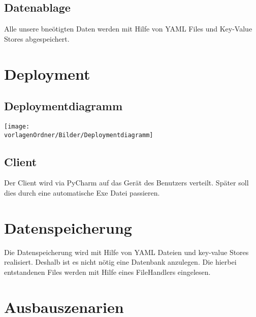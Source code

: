 \documentclass[
	ngerman,
	toc=listof, %
	toc=bibliography, %
	footnotes=multiple, %
	parskip=half, %
	numbers=noendperiod %
]{scrartcl}
\newcommand{\vorlagenOrdner}{../../99_Vorlagen} %
\begin{document}
	\subsection{Datenablage}
		Alle unsere bneötigten Daten werden mit Hilfe von YAML Files und Key-Value Stores abgespeichert. 

\section{Deployment}
	\subsection{Deploymentdiagramm}
		\texttt{[image: \\vorlagenOrdner/Bilder/Deploymentdiagramm]}
	\subsection{Client}
		Der Client wird via PyCharm auf das Gerät des Benutzers verteilt. Später soll dies durch eine automatische Exe Datei passieren.

\section{Datenspeicherung}
	Die Datenspeicherung wird mit Hilfe von YAML Dateien und key-value Stores realisiert. Deshalb ist es nicht nötig eine Datenbank anzulegen. Die hierbei entstandenen Files werden mit Hilfe eines FileHandlers eingelesen.

\section{Ausbauszenarien}
	
\end{document}
